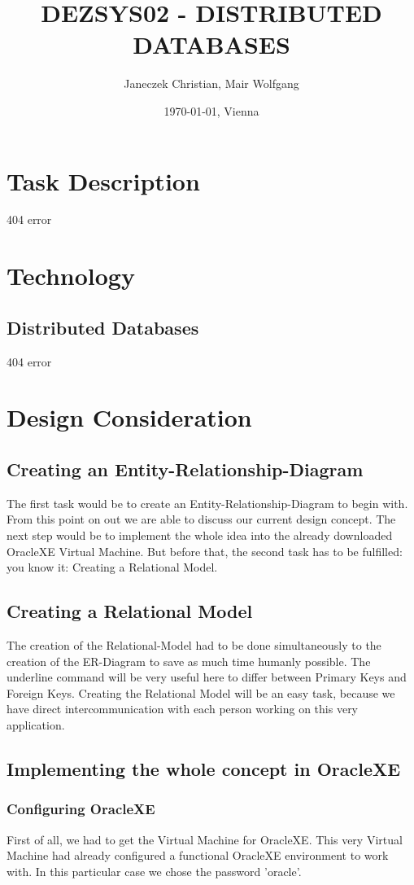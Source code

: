 \documentclass[11pt,a4paper]{article}
\title{\bf DEZSYS02 - DISTRIBUTED DATABASES}
\author{Janeczek Christian, Mair Wolfgang}
\affil{IT Department TGM, Vienna}
\date{\today{}, Vienna}
\begin{document}
\maketitle
\newpage
\tableofcontents
\newpage

\section{Task Description}
404 error

\section{Technology}
\subsection{Distributed Databases}
404 error

\newpage

\section{Design Consideration}
\subsection{Creating an Entity-Relationship-Diagram}
The first task would be to create an Entity-Relationship-Diagram to begin with. From this point on out we are able to discuss our current design concept. The next step would be to implement the whole idea into the already downloaded OracleXE Virtual Machine. But before that, the second task has to be fulfilled: you know it: Creating a Relational Model.
\subsection{Creating a Relational Model}
The creation of the Relational-Model had to be done simultaneously to the creation of the ER-Diagram to save as much time humanly possible. The underline command will be very useful here to differ between Primary Keys and Foreign Keys. Creating the Relational Model will be an easy task, because we have direct intercommunication with each person working on this very application.
\subsection{Implementing the whole concept in OracleXE}
\subsubsection{Configuring OracleXE}
First of all, we had to get the Virtual Machine for OracleXE. This very Virtual Machine had already configured a functional OracleXE environment to work with. In this particular case we chose the password 'oracle'.
\end{document}
